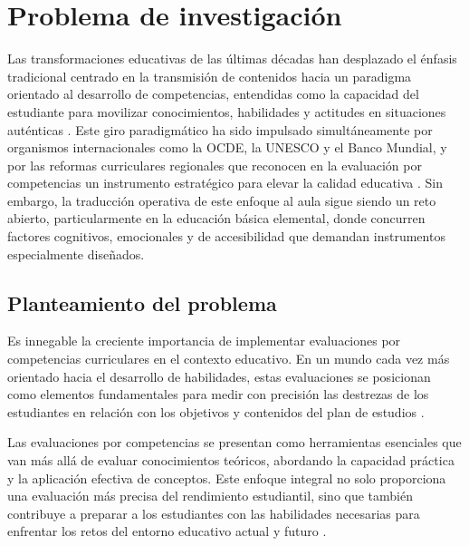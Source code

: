 
\section{Problema de investigación}

Las transformaciones educativas de las últimas décadas han desplazado el énfasis tradicional centrado en la transmisión de contenidos hacia un paradigma orientado al desarrollo de competencias, entendidas como la capacidad del estudiante para movilizar conocimientos, habilidades y actitudes en situaciones auténticas \cite{black1998inside,unesco2022contract,oecd2019compass}. Este giro paradigmático ha sido impulsado simultáneamente por organismos internacionales como la OCDE, la UNESCO y el Banco Mundial, y por las reformas curriculares regionales que reconocen en la evaluación por competencias un instrumento estratégico para elevar la calidad educativa \cite{voinea2025competency,velezvelez2024curriculo}. Sin embargo, la traducción operativa de este enfoque al aula sigue siendo un reto abierto, particularmente en la educación básica elemental, donde concurren factores cognitivos, emocionales y de accesibilidad que demandan instrumentos especialmente diseñados.

\subsection{Planteamiento del problema}

Es innegable la creciente importancia de implementar evaluaciones por competencias curriculares en el contexto educativo. En un mundo cada vez más orientado hacia el desarrollo de habilidades, estas evaluaciones se posicionan como elementos fundamentales para medir con precisión las destrezas de los estudiantes en relación con los objetivos y contenidos del plan de estudios \cite{black1998inside,maskos2025fa}.

Las evaluaciones por competencias se presentan como herramientas esenciales que van más allá de evaluar conocimientos teóricos, abordando la capacidad práctica y la aplicación efectiva de conceptos. Este enfoque integral no solo proporciona una evaluación más precisa del rendimiento estudiantil, sino que también contribuye a preparar a los estudiantes con las habilidades necesarias para enfrentar los retos del entorno educativo actual y futuro \cite{voinea2025competency,oecd2019compass}.


